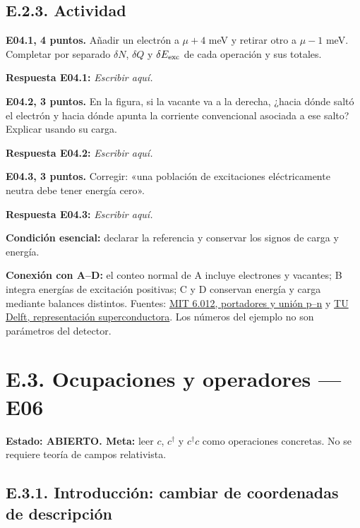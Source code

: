 \documentclass[
  spanish,
  10pt,
  a4paper,
]{article}
\begin{document}
\subsection{E.2.3. Actividad}\label{e.2.3.-actividad}


\textbf{E04.1, 4 puntos.} Añadir un electrón a \(\mu+4\) meV y retirar
otro a \(\mu-1\) meV. Completar por separado \(\delta N\), \(\delta Q\)
y \(\delta E_{\rm exc}\) de cada operación y sus totales.

\textbf{Respuesta E04.1:} \emph{Escribir aquí.}


\textbf{E04.2, 3 puntos.} En la figura, si la vacante va a la derecha,
¿hacia dónde saltó el electrón y hacia dónde apunta la corriente
convencional asociada a ese salto? Explicar usando su carga.

\textbf{Respuesta E04.2:} \emph{Escribir aquí.}


\textbf{E04.3, 3 puntos.} Corregir: «una población de excitaciones
eléctricamente neutra debe tener energía cero».

\textbf{Respuesta E04.3:} \emph{Escribir aquí.}

\textbf{Condición esencial:} declarar la referencia y conservar los
signos de carga y energía.

\textbf{Conexión con A--D:} el conteo normal de A incluye electrones y
vacantes; B integra energías de excitación positivas; C y D conservan
energía y carga mediante balances distintos. Fuentes:
\href{https://web.mit.edu/6.012/www/}{MIT 6.012, portadores y unión
p--n} y \href{https://topocondmat.org/test/w1_topointro/0d.html}{TU
Delft, representación superconductora}. Los números del ejemplo no son
parámetros del detector.


\section{E.3. Ocupaciones y operadores ---
E06}\label{e.3.-ocupaciones-y-operadores-e06}

\textbf{Estado: ABIERTO. Meta:} leer \(c\), \(c^\dagger\) y
\(c^\dagger c\) como operaciones concretas. No se requiere teoría de
campos relativista.

\subsection{E.3.1. Introducción: cambiar de coordenadas de
descripción}\label{e.3.1.-introducciuxf3n-cambiar-de-coordenadas-de-descripciuxf3n}
\end{document}
